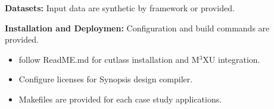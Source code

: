 \documentclass[conference]{IEEEtran}
\newcommand{\MPCMXU}[1]{M$^{3}$XU}
\begin{document}
\noindent\textbf{Datasets:} Input data are synthetic by framework or provided. 

\noindent\textbf{Installation and Deploymen:} Configuration and build commands are provided.

\artcomp
\begin{itemize}
    \item follow ReadME.md for cutlass installation and \MPCMXU{} integration.
    \item Configure licenses for Synopsis design compiler.
    \item Makefiles are provided for each case study applications.
\end{itemize}
\artout










\end{document}
